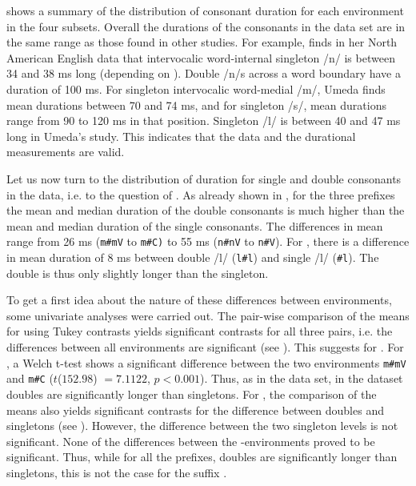  shows a summary of the distribution of consonant duration for each environment in the four subsets. Overall the durations of the consonants in the data set are in the same range as those found in other studies. For example, \citet[Tables II and X]{Umeda.1977} finds in her North American English data that intervocalic word-internal singleton /n/ is between 34 and 38 ms long (depending on ). 
Double /n/s across a word boundary have a duration of 100 ms. For singleton intervocalic word-medial /m/, Umeda finds mean durations between 70 and 74 ms, and for singleton /s/, mean durations range from 90 to 120 ms in that position. Singleton /l/ is between 40 and 47 ms long in Umeda's study. This indicates that the data and the durational measurements are valid.

Let us now turn to the distribution of duration for single and double consonants in the data, i.e. to the question of .  As already shown in , for the three prefixes the mean and median duration of the double consonants is much higher than the mean and median duration of the single consonants. The differences in mean range from 26 ms (\texttt{m\#mV} to  \texttt{m\#C)} to 55 ms (\texttt{n\#nV} to  \texttt{n\#V}). For , there is a difference in mean duration of 8 ms between double /l/ (\texttt{l\#l}) and single /l/ (\texttt{\#l}). The double is thus only slightly longer than the singleton.
  
  



To get a first idea about the nature of these differences between environments, some univariate analyses were carried out. The pair-wise comparison of the means for  using Tukey contrasts yields significant contrasts for all three pairs, i.e. the differences between all environments are significant (see ). This suggests  for . 
For , a Welch t-test shows a significant difference between the two environments \texttt{m\#mV} and \texttt{m\#C} ($t$($152.98$) $=7.1122$, $p< 0.001$). 
Thus, as in the data set, in the dataset doubles are significantly longer than singletons.
For , the comparison of the means also yields significant contrasts for the difference between doubles and singletons (see ). However, the difference between the two singleton levels is not significant. None of the differences between the -environments proved to be significant. Thus, while for all the prefixes, doubles are significantly longer than singletons, this is not the case for the suffix .



